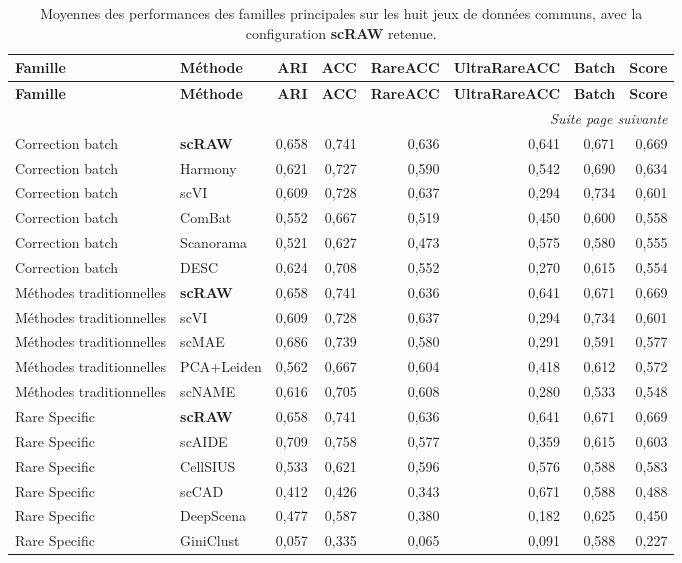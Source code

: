 {\scriptsize
\setlength{\tabcolsep}{3pt}
\renewcommand{\arraystretch}{1.12}
\begin{longtable}{p{}p{}rrrrrr}
\caption{Moyennes des performances des familles principales sur les huit jeux de données communs, avec la configuration \textbf{scRAW} retenue.}\label{tab:common8_primary_all_methods_means}\\
\toprule
\textbf{Famille} & \textbf{Méthode} & \textbf{ARI} & \textbf{ACC} & \textbf{RareACC} & \textbf{UltraRareACC} & \textbf{Batch} & \textbf{Score} \\
\midrule
\endfirsthead
\toprule
\textbf{Famille} & \textbf{Méthode} & \textbf{ARI} & \textbf{ACC} & \textbf{RareACC} & \textbf{UltraRareACC} & \textbf{Batch} & \textbf{Score} \\
\midrule
\endhead
\midrule
\multicolumn{8}{r}{\textit{Suite page suivante}}\\
\endfoot
\bottomrule
\endlastfoot
Correction batch & \textbf{scRAW} & 0,658 & 0,741 & 0,636 & 0,641 & 0,671 & 0,669 \\
Correction batch & Harmony & 0,621 & 0,727 & 0,590 & 0,542 & 0,690 & 0,634 \\
Correction batch & scVI & 0,609 & 0,728 & 0,637 & 0,294 & 0,734 & 0,601 \\
Correction batch & ComBat & 0,552 & 0,667 & 0,519 & 0,450 & 0,600 & 0,558 \\
Correction batch & Scanorama & 0,521 & 0,627 & 0,473 & 0,575 & 0,580 & 0,555 \\
Correction batch & DESC & 0,624 & 0,708 & 0,552 & 0,270 & 0,615 & 0,554 \\
Méthodes traditionnelles & \textbf{scRAW} & 0,658 & 0,741 & 0,636 & 0,641 & 0,671 & 0,669 \\
Méthodes traditionnelles & scVI & 0,609 & 0,728 & 0,637 & 0,294 & 0,734 & 0,601 \\
Méthodes traditionnelles & scMAE & 0,686 & 0,739 & 0,580 & 0,291 & 0,591 & 0,577 \\
Méthodes traditionnelles & PCA+Leiden & 0,562 & 0,667 & 0,604 & 0,418 & 0,612 & 0,572 \\
Méthodes traditionnelles & scNAME & 0,616 & 0,705 & 0,608 & 0,280 & 0,533 & 0,548 \\
Rare Specific & \textbf{scRAW} & 0,658 & 0,741 & 0,636 & 0,641 & 0,671 & 0,669 \\
Rare Specific & scAIDE & 0,709 & 0,758 & 0,577 & 0,359 & 0,615 & 0,603 \\
Rare Specific & CellSIUS & 0,533 & 0,621 & 0,596 & 0,576 & 0,588 & 0,583 \\
Rare Specific & scCAD & 0,412 & 0,426 & 0,343 & 0,671 & 0,588 & 0,488 \\
Rare Specific & DeepScena & 0,477 & 0,587 & 0,380 & 0,182 & 0,625 & 0,450 \\
Rare Specific & GiniClust & 0,057 & 0,335 & 0,065 & 0,091 & 0,588 & 0,227 \\
\end{longtable}
}
